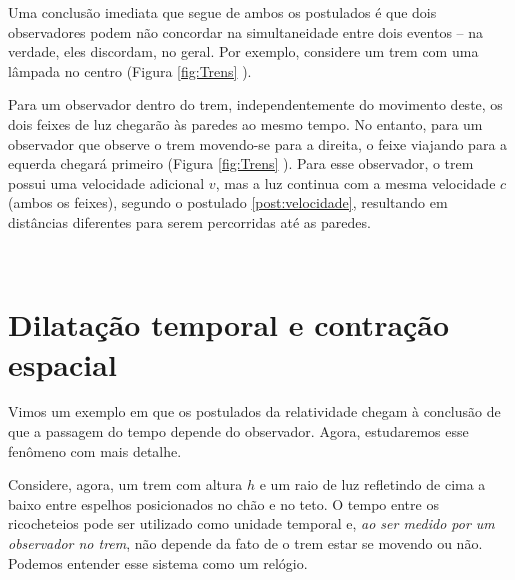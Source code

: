 Uma conclusão imediata que segue de ambos os postulados é que dois observadores podem não concordar na simultaneidade entre dois eventos -- na verdade, eles discordam, no geral. Por exemplo, considere um trem com uma lâmpada no centro (Figura \ref{fig:Trens} ).

Para um observador dentro do trem, independentemente do movimento deste, os dois feixes de luz chegarão às paredes ao mesmo tempo. No entanto, para um observador que observe o trem movendo-se para a direita, o feixe viajando para a equerda chegará primeiro (Figura \ref{fig:Trens} ). Para esse observador, o trem possui uma velocidade adicional $v$, mas a luz continua com a mesma velocidade $c$ (ambos os feixes), segundo o postulado \ref{post:velocidade}, resultando em distâncias diferentes para serem percorridas até as paredes.


\begin{figure*}[t]
    \centering
    \begin{subfigure}[t]{0.5\textwidth}
        \centering
        \caption{}
        \label{fig:trem}
    \end{subfigure}%
    ~ 
    \begin{subfigure}[t]{0.5\textwidth}
        \centering
        \caption{}
        \label{fig:TremMovimento}
    \end{subfigure}
    \caption{Feixes de luz partindo do centro de um trem para (a) um observador que anda junto ao trem e (b) para um observador que vê o trem movendo-se com velocidade $v$ para a direita.}
\label{fig:Trens}
\end{figure*}

\section{Dilatação temporal e contração espacial}\label{sec:DilatacaoContracao}
Vimos um exemplo em que os postulados da relatividade chegam à conclusão de que a passagem do tempo depende do observador. Agora, estudaremos esse fenômeno com mais detalhe.

Considere, agora, um trem com altura $h$ e um raio de luz refletindo de cima a baixo entre espelhos posicionados no chão e no teto. O tempo entre os ricocheteios pode ser utilizado como unidade temporal e, \textit{ao ser medido por um observador no trem}, não depende da fato de o trem estar se movendo ou não. Podemos entender esse sistema como um relógio. 

